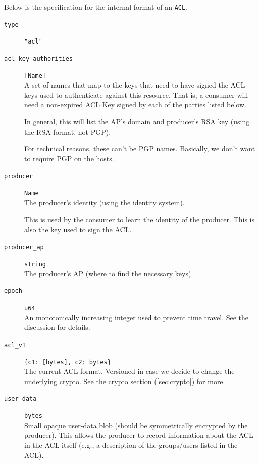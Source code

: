 \documentclass[pdftex,12pt,a4papaer,twoside,notitlepage]{report}
\begin{document}
Below is the specification for the internal format of an \texttt{ACL}.

\begin{leftbar}
\begin{description}
\item[\texttt{type}] \verb|"acl"|
\item[\texttt{acl\_key\_authorities}] \verb=[Name]= \\
  A set of names that map to the keys that need to have signed the ACL keys used
  to authenticate against this resource. That is, a consumer will need a
  non-expired ACL Key signed by each of the parties listed below.
  
  In general, this will list the AP's domain and producer's RSA key (using the
  RSA format, not PGP).
  
  For technical reasons, these can't be PGP names. Basically, we don't want to
  require PGP on the hosts.

\item[\texttt{producer}] \texttt{Name} \\
  The producer's identity (using the identity system).
  
  This is used by the consumer to learn the identity of the producer. This is
  also the key used to sign the ACL.

\item[\texttt{producer\_ap}] \texttt{string} \\
  The producer's AP (where to find the necessary keys).

\item[\texttt{epoch}] \texttt{u64} \\
  An monotonically increasing integer used to prevent
  time travel. See the discussion for details.

\item[\texttt{acl\_v1}] \verb={c1: [bytes], c2: bytes}= \\
  The current ACL format. Versioned in case we decide to change the underlying
  crypto. See the crypto section (\cref{sec:crypto}) for more.

\item[\texttt{user\_data}] \texttt{bytes} \\
  Small opaque user-data blob (should be symmetrically encrypted by the
  producer). This allows the producer to record information about the ACL in the
  ACL itself (e.g., a description of the groups/users listed in the ACL).
\end{description}
\end{leftbar}
\end{document}
